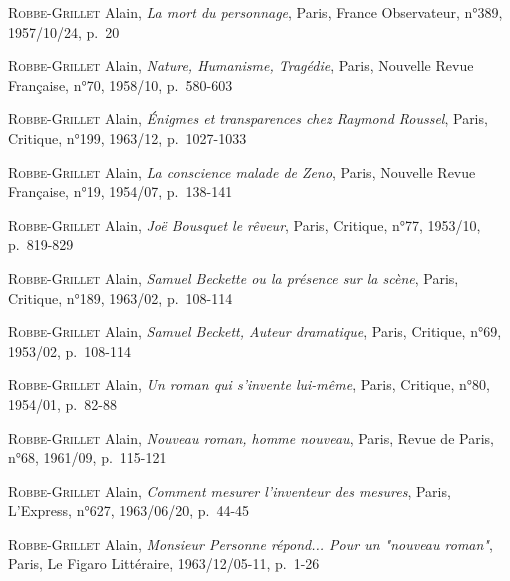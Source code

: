 \documentclass[12pt, a4paper]{article}
\begin{document}
		
		
		
	
		\textsc{Robbe-Grillet} Alain, \textit{La mort du personnage}, Paris, France Observateur, n°389, 1957/10/24, p.~20\par
		
		
		
		
	
		\textsc{Robbe-Grillet} Alain, \textit{Nature, Humanisme, Tragédie}, Paris, Nouvelle Revue Française, n°70, 1958/10, p.~580-603\par
		
		
		
		
	
		\textsc{Robbe-Grillet} Alain, \textit{Énigmes et transparences chez Raymond Roussel}, Paris, Critique, n°199, 1963/12, p.~1027-1033\par
		
		
		
		
	
		\textsc{Robbe-Grillet} Alain, \textit{La conscience malade de Zeno}, Paris, Nouvelle Revue Française, n°19, 1954/07, p.~138-141\par
		
		
		
		
	
		\textsc{Robbe-Grillet} Alain, \textit{Joë Bousquet le rêveur}, Paris, Critique, n°77, 1953/10, p.~819-829\par
		
		
		
		
	
		\textsc{Robbe-Grillet} Alain, \textit{Samuel Beckette ou la présence sur la scène}, Paris, Critique, n°189, 1963/02, p.~108-114\par
		
		
		
		
	
		\textsc{Robbe-Grillet} Alain, \textit{Samuel Beckett, Auteur dramatique}, Paris, Critique, n°69, 1953/02, p.~108-114\par
		
		
		
		
	
		\textsc{Robbe-Grillet} Alain, \textit{Un roman qui s'invente lui-même}, Paris, Critique, n°80, 1954/01, p.~82-88\par
		
		
		
		
	
		\textsc{Robbe-Grillet} Alain, \textit{Nouveau roman, homme nouveau}, Paris, Revue de Paris, n°68, 1961/09, p.~115-121\par
		
		
		
		
	
		\textsc{Robbe-Grillet} Alain, \textit{Comment mesurer l'inventeur des mesures}, Paris, L'Express, n°627, 1963/06/20, p.~44-45\par
		
		
		
		
	
		\textsc{Robbe-Grillet} Alain, \textit{Monsieur Personne répond... Pour un "nouveau roman"}, Paris, Le Figaro Littéraire, 1963/12/05-11, p.~1-26\par
		
			
\end{document}
